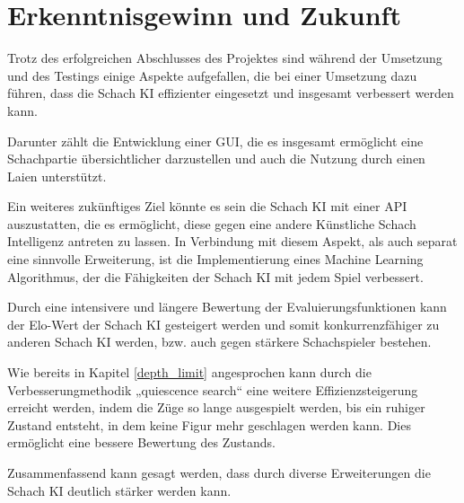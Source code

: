 \section{Erkenntnisgewinn und Zukunft}
Trotz des erfolgreichen Abschlusses des Projektes sind während der Umsetzung und des Testings einige Aspekte aufgefallen, die bei einer Umsetzung dazu führen, dass die Schach KI effizienter eingesetzt und insgesamt verbessert werden kann.

Darunter zählt die Entwicklung einer GUI, die es insgesamt ermöglicht eine Schachpartie übersichtlicher darzustellen und auch die Nutzung durch einen Laien unterstützt.

Ein weiteres zukünftiges Ziel könnte es sein die Schach KI mit einer API auszustatten, die es ermöglicht, diese gegen eine andere Künstliche Schach Intelligenz antreten zu lassen. In Verbindung mit diesem Aspekt, als auch separat eine sinnvolle Erweiterung, ist die Implementierung eines Machine Learning Algorithmus, der die Fähigkeiten der Schach KI mit jedem Spiel verbessert.

Durch eine intensivere und längere Bewertung der Evaluierungsfunktionen kann der Elo-Wert der Schach KI gesteigert werden und somit konkurrenzfähiger zu anderen Schach KI werden, bzw. auch gegen stärkere Schachspieler bestehen.

Wie bereits in Kapitel \ref{depth_limit} angesprochen kann durch die Verbesserungmethodik „quiescence search“ eine weitere Effizienzsteigerung erreicht werden, indem die Züge so lange ausgespielt werden, bis ein ruhiger Zustand entsteht, in dem keine Figur mehr geschlagen werden kann. Dies ermöglicht eine bessere Bewertung des Zustands.

Zusammenfassend kann gesagt werden, dass durch diverse Erweiterungen die Schach KI deutlich stärker werden kann.